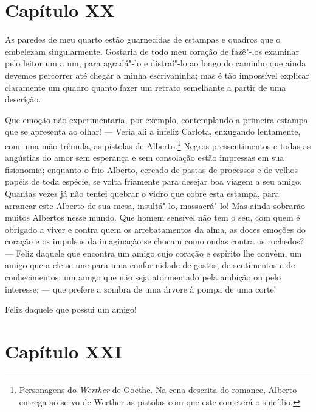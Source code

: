 \section*{Capítulo XX}

 As paredes de meu quarto estão guarnecidas de estampas e quadros que o
embelezam singularmente. Gostaria de todo meu coração de fazê"-los
examinar pelo leitor um a um, para agradá"-lo e distraí"-lo ao longo do
caminho que ainda devemos percorrer até chegar a minha escrivaninha;
mas é tão impossível explicar claramente um quadro quanto fazer um
retrato semelhante a partir de uma descrição.

 Que emoção não experimentaria, por exemplo, contemplando a primeira
estampa que se apresenta ao olhar! --- Veria ali a infeliz Carlota,
enxugando lentamente, com uma mão trêmula, as pistolas de
Alberto.\footnote{ Personagens do \textit{Werther} de Goëthe. Na cena
descrita do romance, Alberto entrega ao servo de Werther as pistolas
com que este cometerá o suicídio.} Negros pressentimentos e todas
as angústias do amor sem esperança e sem consolação estão impressas em
sua fisionomia; enquanto o frio Alberto, cercado de pastas de processos
e de velhos papéis de toda espécie, se volta friamente para desejar boa
viagem a seu amigo. Quantas vezes já não tentei quebrar o vidro que
cobre esta estampa, para arrancar este Alberto de sua mesa, insultá"-lo,
massacrá"-lo! Mas ainda sobrarão muitos Albertos nesse mundo. Que homem
sensível não tem o seu, com quem é obrigado a viver e contra quem os
arrebatamentos da alma, as doces emoções do coração e os impulsos da
imaginação se chocam como ondas contra os rochedos? --- Feliz daquele
que encontra um amigo cujo coração e espírito lhe convêm, um amigo que
a ele se une para uma conformidade de gostos, de sentimentos e de
conhecimentos; um amigo que não seja atormentado pela ambição ou pelo
interesse; --- que prefere a sombra de uma árvore à pompa de uma corte!

 Feliz daquele que possui um amigo!

\section*{Capítulo XXI}

